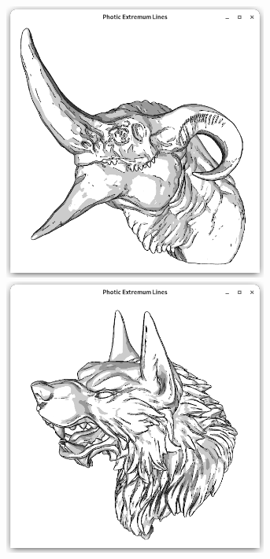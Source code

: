 \documentclass[9pt,fleqn,twoside,twocolumn]{stdglobal}
\begin{document}
\begin{figure}
\begin{subfigure}[t]{0.19\textwidth}
        \includegraphics[width=0.95\textwidth,trim={15px 15 15 50},clip]{images/results/dragon-head-contours-pel-toon.png}
        \includegraphics[width=0.95\textwidth,trim={15px 15 15 50},clip]{images/results/werewolf-contours-pel-toon.png}

\end{subfigure}
\end{figure}
\end{document}
